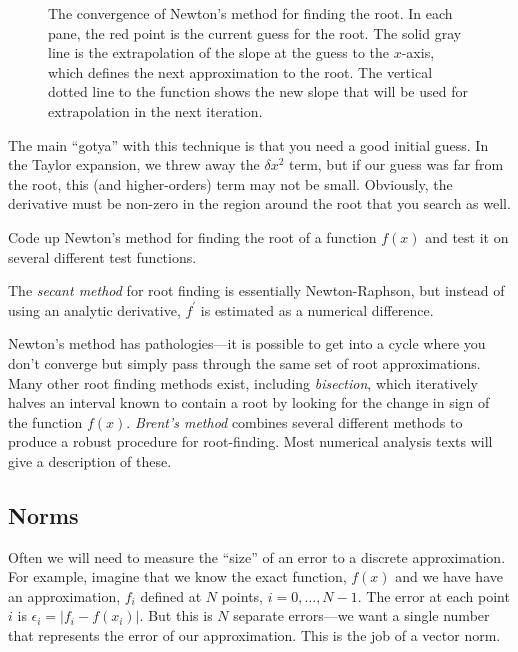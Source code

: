 \begin{figure}
\caption[Convergence of Newton's method for root
  finding]{\label{fig:newtonsmethod} The convergence of Newton's
  method for finding the root.  In each pane, the red point is the
  current guess for the root.  The solid gray line is the
  extrapolation of the slope at the guess to the $x$-axis, which
  defines the next approximation to the root.  The vertical dotted
  line to the function shows the new slope that will be used for
  extrapolation in the next iteration.}
\end{figure}


The main ``gotya'' with this technique is that you need a good initial
guess.  In the Taylor expansion, we threw away the $\delta x^2$ term,
but if our guess was far from the root, this (and higher-orders) term
may not be small.  Obviously, the derivative must be non-zero in the
region around the root that you search as well.

\begin{exercise}
{Code up Newton's method for finding the root of a function $f(x)$
and test it on several different test functions.}
\end{exercise}
The {\em secant method} for root finding is essentially
Newton-Raphson, but instead of using an analytic derivative,
$f^\prime$ is estimated as a numerical difference.

Newton's method has pathologies---it is possible to get into a cycle
where you don't converge but simply pass through the same set of root
approximations.  Many other root finding methods exist, including {\em
  bisection}, which iteratively halves an interval known to contain a
root by looking for the change in sign of the function $f(x)$.  {\em
  Brent's method} combines several different methods to produce a
robust procedure for root-finding.  Most numerical analysis texts will
give a description of these.

\subsection{Norms}

Often we will need to measure the ``size'' of an error to a discrete
approximation.  For example, imagine that we know the exact function,
$f(x)$ and we have have an approximation, $f_i$ defined at $N$ points,
$i = 0, \ldots, N-1$.  The error at each point $i$ is $\epsilon_i =
|f_i - f(x_i)|$.  But this is $N$ separate errors---we want a single
number that represents the error of our approximation.  This is the
job of a vector norm.  

